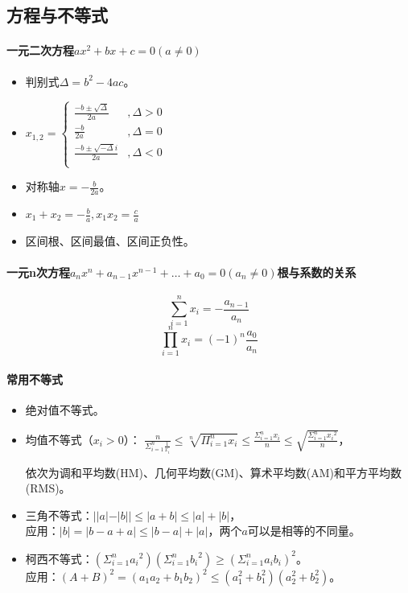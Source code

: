 \documentclass[
12pt, %
a4paper, 
oneside, %
headinclude,footinclude, %
]{scrartcl}
\begin{document}
\subsection[方程与不等式]{方程与不等式}
\paragraph{一元二次方程$ ax^2 + bx + c = 0(a \neq 0) $}
\begin{itemize}
\item 判别式$ \varDelta = b^2 - 4ac $。
\item 
$
x_{1,2}=
\begin{cases}
\frac{-b \pm \sqrt{\varDelta}}{2a} &, \varDelta > 0 \\
\frac{-b}{2a} &, \varDelta = 0 \\
\frac{-b \pm \sqrt{-\varDelta}i}{2a} &, \varDelta < 0 \\
\end{cases}
$
\item 对称轴$ x = -\frac{b}{2a} $。
\item $ x_1 + x_2 = -\frac{b}{a}, x_1 x_2 = \frac{c}{a} $
\item 区间根、区间最值、区间正负性。
\end{itemize}
\paragraph{一元n次方程$ a_n x^n + a_{n - 1} x^{n - 1} + \dots + a_0 = 0 (a_n \neq 0) $根与系数的关系}
$$ \sum_{i = 1}^{n}x_i = -\frac{a_{n - 1}}{a_n} $$
$$ \prod_{i = 1}^{n}x_i = (-1)^n \frac{a_0}{a_n} $$ 
\paragraph{常用不等式}
\begin{itemize}
\item 绝对值不等式。
\item 均值不等式（$ x_i > 0 $）：
$
\frac{n}{\Sigma_{i = 1}^n \frac{1}{x_i}}
\leq \sqrt[n]{\Pi_{i = 1}^n x_i}
\leq \frac{\Sigma_{i = 1}^n x_i}{n}
\leq \sqrt{\frac{\Sigma_{i = 1}^n {x_i}^2}{n}}
$，

依次为调和平均数(HM)、几何平均数(GM)、算术平均数(AM)和平方平均数(RMS)。
\item 三角不等式：$ ||a|-|b|| \leq |a + b| \leq |a| + |b|$， \\
应用：$ |b| = |b - a + a| \leq |b - a| + |a| $，两个$ a $可以是相等的不同量。
\item 柯西不等式：$ (\Sigma_{i = 1}^n {a_i}^2)(\Sigma_{i = 1}^n {b_i}^2)\geq (\Sigma_{i=1}^n {a_i}{b_i})^2 $。 \\
应用：$ (A + B)^2 = (a_1 a_2 + b_1 b_2)^2 \leq (a_1^2 + b_1^2)(a_2^2 + b_2^2) $。
\end{itemize}
\end{document}
